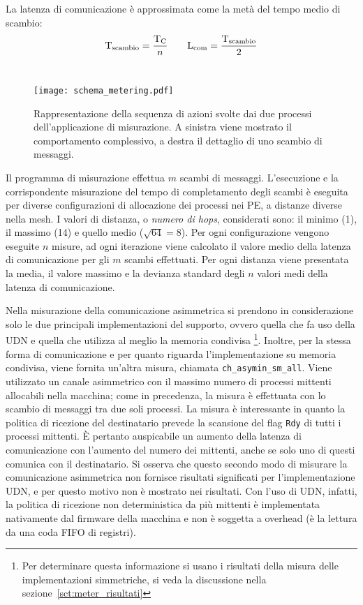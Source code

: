 La latenza di comunicazione \`e approssimata come la met\`a del tempo medio di scambio:
\[ \mathrm{T}_{\mathrm{scambio}} = \frac{\mathrm{T}_\mathrm{C}}{n} \qquad \mathrm{L}_{\mathrm{com}} = \frac{\mathrm{T}_{\mathrm{scambio}}}{2} \] \\

\begin{figure}[!t]
  \centering
  \texttt{[image: schema\_metering.pdf]}
  \caption[Comportamento temporale dell'applicazione ``ping-pong'']{Rappresentazione della sequenza di azioni svolte dai due processi dell'applicazione di misurazione. A sinistra viene mostrato il comportamento complessivo, a destra il dettaglio di uno scambio di messaggi.}
  \label{fig:schema_metering}
\end{figure}

Il programma di misurazione effettua $m$ scambi di messaggi. L'esecuzione e la corrispondente misurazione del tempo di completamento degli scambi \`e eseguita per diverse configurazioni di allocazione dei processi nei PE, a distanze diverse nella mesh. I valori di distanza, o \emph{numero di hops}, considerati sono: il minimo (1), il massimo (14) e quello medio ($\sqrt{64} = 8$). Per ogni configurazione vengono eseguite $n$ misure, ad ogni iterazione viene calcolato il valore medio della latenza di comunicazione per gli $m$ scambi effettuati. Per ogni distanza viene presentata la media, il valore massimo e la devianza standard degli $n$ valori medi della latenza di comunicazione. 

Nella misurazione della comunicazione asimmetrica si prendono in considerazione solo le due principali implementazioni del supporto, ovvero quella che fa uso della UDN e quella che utilizza al meglio la memoria condivisa \footnote{Per determinare questa informazione si usano i risultati della misura delle implementazioni simmetriche, si veda la discussione nella sezione~\ref{sct:meter_risultati}}. Inoltre, per la stessa forma di comunicazione e per quanto riguarda l'implementazione su memoria condivisa, viene fornita un'altra misura, chiamata \verb+ch_asymin_sm_all+. Viene utilizzato un canale asimmetrico con il massimo numero di processi mittenti allocabili nella macchina; come in precedenza, la misura \`e effettuata con lo scambio di messaggi tra due soli processi. La misura \`e interessante in quanto la politica di ricezione del destinatario prevede la scansione del flag \verb+Rdy+ di tutti i processi mittenti. \`E pertanto auspicabile un aumento della latenza di comunicazione con l'aumento del numero dei mittenti, anche se solo uno di questi comunica con il destinatario. Si osserva che questo secondo modo di misurare la comunicazione asimmetrica non fornisce risultati significati per l'implementazione UDN, e per questo motivo non \`e mostrato nei risultati. Con l'uso di UDN, infatti, la politica di ricezione non deterministica da pi\`u mittenti \`e implementata nativamente dal firmware della macchina e non \`e soggetta a overhead (\`e la lettura da una coda FIFO di registri).
